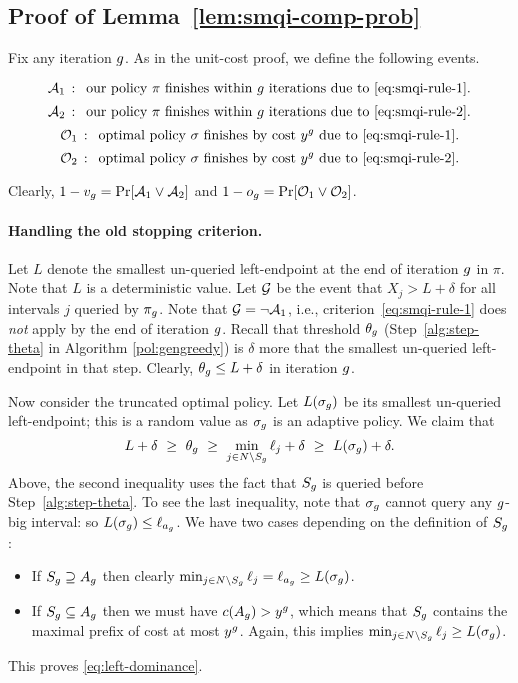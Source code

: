 \documentclass[11pt]{article}
\theoremstyle{remark}
\theoremstyle{plain}
\theoremstyle{remark}
\begin{document}
\subsection{Proof of Lemma~\ref{lem:smqi-comp-prob}}

Fix any iteration $g$. As in the unit-cost \smqi proof, we define the following events.


$$ {\cal A}_1 \,:\, \text{    our policy $\pi$   finishes within $g$ iterations due to~\eqref{eq:smqi-rule-1}.}$$
$$ {\cal A}_2 \,:\, \text{    our policy $\pi$   finishes within $g$ iterations due to~\eqref{eq:smqi-rule-2}.}$$
$$ {\cal O}_1 \,:\, \text{    optimal policy $\sigma$   finishes by  cost $y^g$  due to~\eqref{eq:smqi-rule-1}.}$$
$$ {\cal O}_2 \,:\, \text{    optimal policy $\sigma$   finishes  by  cost $y^g$  due to~\eqref{eq:smqi-rule-2}.}$$

Clearly, $1-v_g = \Pr[{\cal A}_1\vee {\cal A}_2]$ and $1-o_g = \Pr[{\cal O}_1\vee {\cal O}_2]$. 

\paragraph{Handling the old stopping criterion.}
Let $L$ denote the smallest un-queried left-endpoint at the end of iteration $g$ in $\pi$.  Note that $L$ is a deterministic value. Let  
${\cal G}$ be the event that $X_j > L+\delta$ for all intervals $j$  queried by $\pi_g$.  Note that ${\cal G}=\neg {\cal A}_1$, i.e., criterion~\eqref{eq:smqi-rule-1} does {\em not} apply by the end of iteration $g$. 
Recall that threshold $\theta_g$ (Step~\ref{alg:step-theta} in Algorithm \ref{pol:gengreedy})  is $\delta$ more that the smallest un-queried left-endpoint in that step. Clearly,  $\theta_g \le L+\delta$ in iteration $g$.


Now consider the truncated optimal policy. Let $L(\sigma_g)$ be its smallest un-queried left-endpoint; this is a random value as $\sigma_g$ is an adaptive policy. We claim that 
\begin{equation}
    \label{eq:left-dominance}
    L+\delta \,\, \ge  \,\,\theta_g \,\, \ge  \,\,\min_{j\in N\setminus S_g} \ell_j  +\delta  \,\,\ge  \,\,L(\sigma_g) +\delta.
\end{equation}
Above,  the second inequality uses the fact that $S_g$ is queried before Step~\ref{alg:step-theta}.  To see the last  inequality, note that  $\sigma_g$ cannot query any $g$-big interval: so  $L(\sigma_g)\le \ell_{a_g}$.  We have two cases depending on the definition of $S_g$:
\begin{itemize}
    \item If $S_g\supseteq A_g$ then clearly $\min_{j\in N\setminus S_g} \ell_j = \ell_{a_g} \ge L(\sigma_g)$. 
    \item If $S_g\subseteq A_g$ then we must have $c(A_g)>y^g$, which means that $S_g$ contains the maximal prefix of cost at most $y^g$. Again, this implies $\min_{j\in N\setminus S_g} \ell_j \ge  L(\sigma_g)$.
\end{itemize}
This proves \eqref{eq:left-dominance}. 
\end{document}
